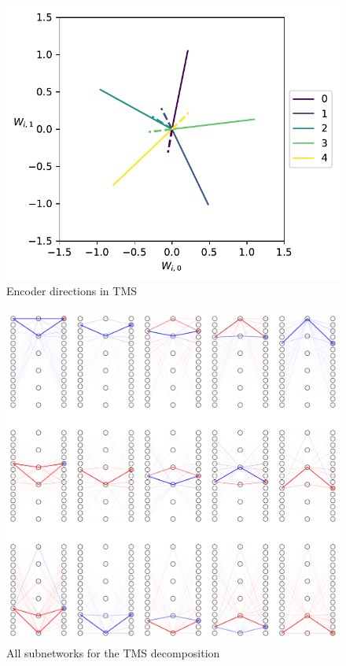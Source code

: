 \documentclass{article}
\theoremstyle{plain}
\theoremstyle{definition}
\theoremstyle{remark}
\begin{document}
\begin{figure}[ht]
    \centerline{\includegraphics{../figures/s2_tms_encoder_directions.pdf}}
    \centering
    \caption{Encoder directions in TMS}\label{fig:s2_tms_encoder_directions}
\end{figure}


\begin{figure}[ht]
    \centerline{\includegraphics[width=\textwidth]{../figures/s3_tms_full_subnetworks.pdf}}
    \centering
    \caption{All subnetworks for the TMS decomposition}\label{fig:s3_tms_full_subnetworks}
\end{figure}
\end{document}
